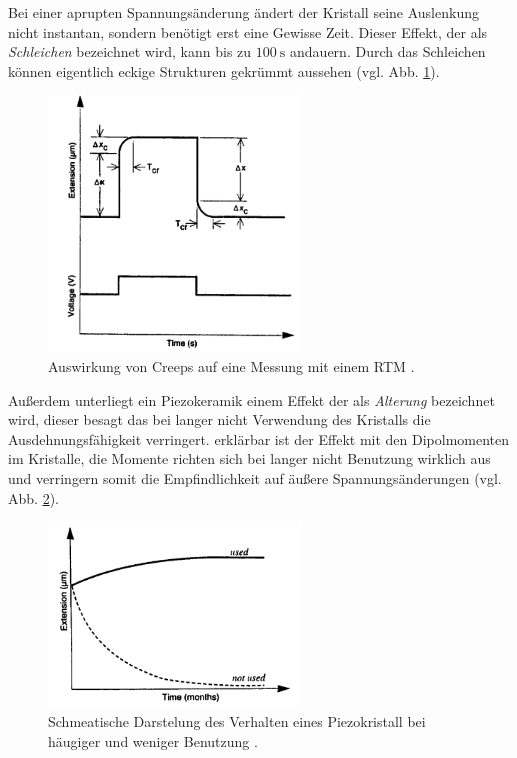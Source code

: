 Bei einer aprupten Spannungsänderung ändert der Kristall seine Auslenkung nicht instantan, sondern benötigt erst eine Gewisse Zeit.
Dieser Effekt, der als \emph{Schleichen} bezeichnet wird, kann bis zu $\SI{100}{\second}$ andauern.
Durch das Schleichen können eigentlich eckige Strukturen gekrümmt aussehen (vgl. Abb. \ref{fig: creep}).
\begin{figure}[!h]
  \centering
  \includegraphics[width=0.6\textwidth]{./pics/creep.png}
  \caption{Auswirkung von Creeps auf eine Messung mit einem RTM \cite{rtm}.}
  \label{fig: creep}
\end{figure}
Außerdem unterliegt ein Piezokeramik einem Effekt der als \emph{Alterung} bezeichnet wird, dieser besagt
das bei langer nicht Verwendung des Kristalls die Ausdehnungsfähigkeit verringert. erklärbar ist der Effekt mit den
Dipolmomenten im Kristalle, die Momente richten sich bei langer nicht Benutzung wirklich aus und verringern
somit die Empfindlichkeit auf äußere Spannungsänderungen (vgl. Abb. \ref{fig: ageing}).
\begin{figure}[!h]
  \centering
  \includegraphics[width=0.6\textwidth]{./pics/ageing.png}
  \caption{Schmeatische Darstelung des Verhalten eines Piezokristall bei häugiger und weniger Benutzung \cite{rtm}.}
  \label{fig: ageing}
\end{figure}
